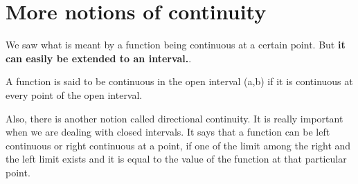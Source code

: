 \section{More notions of continuity}

We saw what is meant by a function being continuous at a certain point. But \textbf{it can easily be extended to an interval.}. 

\begin{outline}
    A function is said to be continuous in the open interval (a,b) if it is continuous at every point of the open interval. 
\end{outline}

Also, there is another notion called directional continuity. It is really important when we are dealing with closed intervals. It says that a function can be left continuous or right continuous at a point, if one of the limit among the right and the left limit exists and it is equal to the value of the function at that particular point. 
